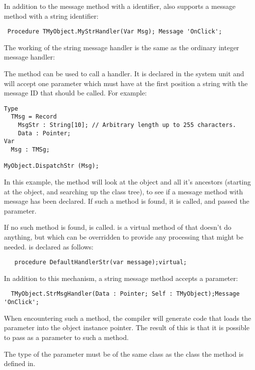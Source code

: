 In addition to the message method with a  identifier,
\fpc also supports a message method with a string identifier:
\begin{verbatim}
 Procedure TMyObject.MyStrHandler(Var Msg); Message 'OnClick';
\end{verbatim}

The working of the string message handler is the same as the ordinary
integer message handler:

The  method can be used to call a 
handler. It is declared in the system unit and will accept one parameter
which must have at the first position a string with the message ID that
should be called. For example:
\begin{verbatim}
Type
  TMsg = Record
    MsgStr : String[10]; // Arbitrary length up to 255 characters.
    Data : Pointer;
Var
  Msg : TMSg;

MyObject.DispatchStr (Msg);
\end{verbatim}
In this example, the  method will look at the object and
all it's ancestors (starting at the object, and searching up the class tree),
to see if a message method with message  has been
declared. If such a method is found, it is called, and passed the
 parameter.

If no such method is found,  is called.
 is a virtual method of  that doesn't do
anything, but which can be overridden to provide any processing that might be
needed.  is declared as follows:
\begin{verbatim}
   procedure DefaultHandlerStr(var message);virtual;
\end{verbatim}

In addition to this mechanism, a string message method accepts a 
parameter:
\begin{verbatim}
  TMyObject.StrMsgHandler(Data : Pointer; Self : TMyObject);Message 'OnClick';
\end{verbatim}
When encountering such a method, the compiler will generate code that loads
the  parameter into the object instance pointer. The result of
this is that it is possible to pass  as a parameter to such a
method.

\begin{remark}
The type of the  parameter must be of the same class
as the class the method is defined in.
\end{remark}

